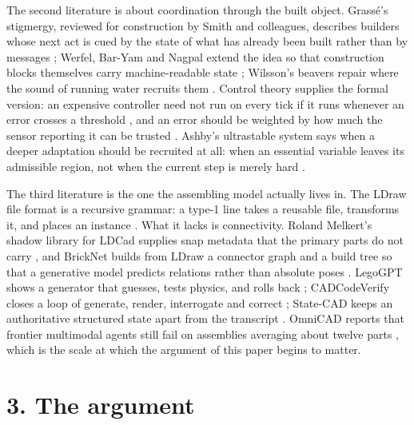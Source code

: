 \documentclass[11pt,a4paper]{article}
\begin{document}
The second literature is about coordination through the built object. Grassé's stigmergy, reviewed for construction by Smith and colleagues, describes builders whose next act is cued by the state of what has already been built rather than by messages \cite{smith2018architecture}; Werfel, Bar-Yam and Nagpal extend the idea so that construction blocks themselves carry machine-readable state \cite{werfel2005stigmergy}; Wilsson's beavers repair where the sound of running water recruits them \cite{wilsson1962beaver}. Control theory supplies the formal version: an expensive controller need not run on every tick if it runs whenever an error crosses a threshold \cite{tabuada2007event}, and an error should be weighted by how much the sensor reporting it can be trusted \cite{friston2011active}. Ashby's ultrastable system says when a deeper adaptation should be recruited at all: when an essential variable leaves its admissible region, not when the current step is merely hard \cite{ashby1960design}.

The third literature is the one the assembling model actually lives in. The LDraw file format is a recursive grammar: a type-1 line takes a reusable file, transforms it, and places an instance \cite{ldrawformatspec}. What it lacks is connectivity. Roland Melkert's shadow library for LDCad supplies snap metadata that the primary parts do not carry \cite{melkertldcadshadow}, and BrickNet builds from LDraw a connector graph and a build tree so that a generative model predicts relations rather than absolute poses \cite{kulits2026bricknet}. LegoGPT shows a generator that guesses, tests physics, and rolls back \cite{pun2025legogpt}; CADCodeVerify closes a loop of generate, render, interrogate and correct \cite{alrashedy2025cadcodeverify}; State-CAD keeps an authoritative structured state apart from the transcript \cite{lin2026statecad}. OmniCAD reports that frontier multimodal agents still fail on assemblies averaging about twelve parts \cite{wang2026omnicad}, which is the scale at which the argument of this paper begins to matter.

\section*{3. The argument}
\end{document}
